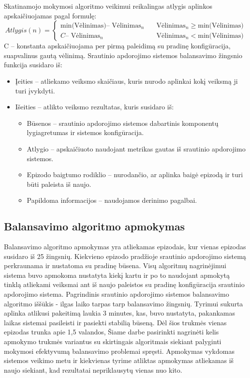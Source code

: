 \documentclass{VUMIFPSbakalaurinis}
\begin{document}
Skatinamojo mokymosi algoritmo veikimui reikalingas atlygis aplinkos apskaičiuojamas pagal formulę:
\[ Atlygis(n) =
\begin{cases}
    \text{min(Vėlinimas)} – \text{ Vėlinimas}_n  & \quad \text{Vėlinimas}_n \geq \text{min(Vėlinimas)}\\
    C – \text{ Vėlinimas}_n  & \quad \text{Vėlinimas}_n < \text{min(Vėlinimas)}
\end{cases}
\]
C – konstanta apskaičiuojama per pirmą paleidimą su pradinę konfigūracija, suapvalinus gautą vėlinimą. \newline
Srautinio apdorojimo sistemos balansavimo žingsnio funkcija susidaro iš:
\begin{itemize}
 \item Įeities – atliekamo veiksmo skaičiaus, kuris nurodo aplinkai kokį veiksmą ji turi įvykdyti.
 \item Išeities – atlikto veiksmo rezultatas, kuris susidaro iš:
 \begin{itemize}
    \item Būsenos – srautinio apdorojimo sistemos dabartinis komponentų lygiagretumas ir sistemos konfigūracija.
    \item Atlygio – apskaičiuoto naudojant metrikas gautas iš srautinio apdorojimo sistemos.
    \item Epizodo baigtumo rodiklio – nurodančio, ar aplinka baigė epizodą ir turi būti paleista iš naujo.
    \item Papildoma informacijos – naudojamos derinimo pagalbai.
 \end{itemize}
\end{itemize}

\subsection{Balansavimo algoritmo apmokymas}

Balansavimo algoritmo apmokymas yra atliekamas epizodais, kur vienas epizodas susidaro iš 25 žingsnių. Kiekvieno epizodo pradžioje srautinio apdorojimo sistemą perkraunama ir nustatoma su pradinę būsena. Visų algoritmų nagrinėjimui sistema buvo apmokoma nustatyta kiekį kartu ir po to naudojant apmokytą tinklą atliekami veiksmai ant iš naujo paleistos su pradinę konfigūracija srautinio apdorojimo sistema. Pagrindinis srautinio apdorojimo sistemos balansavimo algoritmo iššūkis - ilgas laiko tarpas tarp balansavimo žingsnių. Tyrimui sukurta aplinka atlikusi pakeitimą laukia 3 minutes, kas, buvo nustatyta, pakankamas laikas sistemai pasileisti ir pasiekti stabilią būseną. Dėl šios trukmės vienas epizodas trunka apie 1,5 valandos, Šiame darbe pasirinkti nagrinėti kelis apmokymo trukmės variantus su skirtingais algoritmais siekiant palyginti mokymosi efektyvumą balansavimo problemai spręsti. Apmokymas vykdomas sistemos veikimo metu ir kiekvienas tyrime atliktas apmokymas atliekamas iš naujo siekiant, kad rezultatai nepriklausytų vienas nuo kito.
\end{document}
